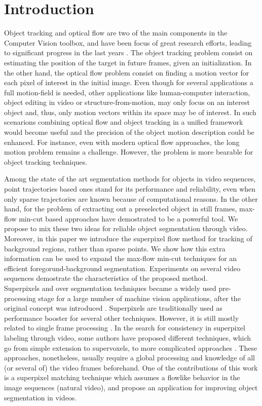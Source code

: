 \section{Introduction}
\label{sec:introduction}

Object tracking and optical flow are two of the main components in the
Computer Vision toolbox, and have been focus of great research efforts, 
leading to significant progress in the last years \cite{c16}\cite{c17}. 
The object tracking problem consist on estimating the 
position of the target in future frames, given an initialization. In the
other hand, the optical flow problem consist on finding a motion vector 
for each pixel of interest in the initial image. Even though for several
applications a full motion-field is needed, other applications like
human-computer interaction, object editing in video or structure-from-motion,
may only focus on an interest object and, thus, only motion vectors within its 
space may be of interest. 
In such scenarions combining optical flow and object tracking in a unified 
framework would become useful and the precision of the object motion description 
could be enhanced. For instance, even with modern optical flow approaches, 
the long motion problem remains a challenge. 
However, the problem is more bearable for object tracking techniques. 

Among the state of the art segmentation methods for objects in video
sequences, point trajectories based ones stand for its performance and 
reliability, even when only sparse trajectories are known because of
computational reasons. In the other hand, for the problem of extracting out a 
preselected object in still frames, max-flow min-cut based approaches 
have demostrated to be a powerful tool. We propose to mix these two 
ideas for reliable object segmentation through video. Moreover, in this paper 
we introduce the superpixel flow method for tracking of background regions, 
rather than sparse points. We show how this extra information 
can be used to expand the max-flow min-cut techniques for an 
efficient foregorund-background segmentation. Experiments on 
several video sequences demostrate the characteristics of the proposed 
method. \\
Superpixels and over segmentation techniques
became a widely used pre-processing stage for a
large number of machine vision applications, after the
original concept was introduced \cite{c1}. Superpixels are
traditionally used as performance booster for several
other techniques. However, it is still mostly related to
single frame processing \cite{c1}\cite{c10}\cite{c11}. In the search for
consistency in superpixel labeling through video,
some authors have proposed different techniques,
which go from simple extension to supervoxels\cite{c9}\cite{c11},
to more complicated approaches \cite{c8}. These
approaches, nonetheless, usually require a global
processing and knowledge of all (or several of) the
video frames beforehand. One of the contributions of this work is a superpixel
matching technique which assumes a flowlike
behavior in the image sequences (natural video), and
propose an application for improving object segmentation in videos.


